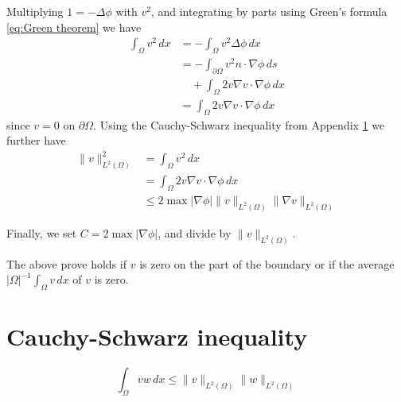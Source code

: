 \documentclass[conference]{IEEEtran}
\begin{document}
Multiplying $1 = -\Delta\phi$ with $v^2$, and integrating by parts using Green's formula \ref{eq:Green theorem} we have
\begin{equation}
\begin{aligned}
    \int_\Omega v^2 \, dx &= -\int_\Omega v^2 \Delta\phi \, dx \\
    &= - \int_{\partial\Omega}v^2 n \cdot \nabla\phi \, ds \\
    &\quad + \int_\Omega 2v\nabla v \cdot \nabla\phi \, dx \\
    &= \int_\Omega 2v\nabla v \cdot \nabla\phi \, dx
\end{aligned}
\end{equation}
since $v = 0$ on $\partial\Omega$. Using the Cauchy-Schwarz inequality from Appendix \ref{sec:Cauchy-Schwarz inequality} we further have
\begin{equation}
\begin{aligned}
    \|v\|_{L^2(\Omega)}^2 &= \int_\Omega v^2 \, dx \\
    &= \int_\Omega 2v\nabla v \cdot \nabla\phi \, dx \\
    &\leq 2\max |\nabla\phi| \|v\|_{L^2(\Omega)} \|\nabla v\|_{L^2(\Omega)}
\end{aligned}
\end{equation}

Finally, we set $C = 2\max |\nabla\phi|$, and divide by $\|v\|_{L^2(\Omega)}$.

The above prove holds if $v$ is zero on the part of the boundary or if the average $|\Omega|^{-1}\int_\Omega v \, dx$ of $v$ is zero.

\section{Cauchy-Schwarz inequality} \label{sec:Cauchy-Schwarz inequality}
\begin{equation}
    \int_\Omega vw \, dx \leq \|v\|_{L^2(\Omega)} \|w\|_{L^2(\Omega)}
\end{equation}
\end{document}
